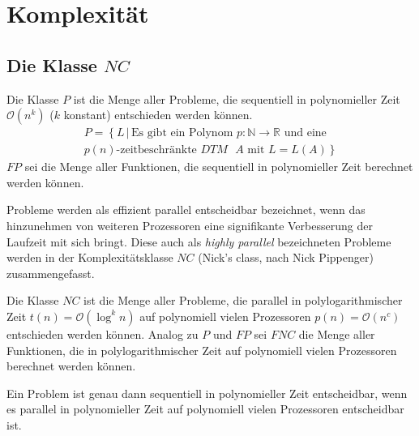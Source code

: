 \section{Komplexität}

\subsection{Die Klasse $NC$}
\begin{define}
    Die Klasse $P$ ist die Menge aller Probleme, die sequentiell in 
    polynomieller Zeit $\mathcal{O}(n^k)$ ($k$ konstant) entschieden werden können.
    \begin{equation}
        \begin{split}
            P = \left\{ L \, | \, \text{Es gibt ein Polynom } p\colon \mathbb{N} \to \mathbb{R} \right.
            \text{ und eine} \\ \left. \text{$p(n)$-zeitbeschränkte $DTM$ $A$ mit } L = L(A) \right\}
        \end{split}
    \end{equation}
    $FP$ sei die Menge aller Funktionen, die sequentiell in polynomieller Zeit
    berechnet werden können.
    \cite[S.205]{fgi1}\cite[S.44f]{greenlaw}
\end{define}
%
Probleme werden als effizient parallel entscheidbar bezeichnet, wenn das
hinzunehmen von weiteren Prozessoren eine signifikante Verbesserung der
Laufzeit mit sich bringt.
Diese auch als \emph{highly parallel} bezeichneten Probleme werden in der
Komplexitätsklasse $NC$ (Nick's class, nach Nick Pippenger) zusammengefasst.
%
\begin{define}
    Die Klasse $NC$ ist die Menge aller Probleme, die parallel in
    polylogarithmischer Zeit $t(n) = \mathcal{O}(\log^k n)$ auf polynomiell
    vielen Prozessoren $p(n) = \mathcal{O}(n^c)$ entschieden werden können.
    Analog zu $P$ und $FP$ sei $FNC$ die Menge aller Funktionen, die in
    polylogarithmischer Zeit auf polynomiell vielen Prozessoren berechnet
    werden können.
    \cite[S.44f]{greenlaw}
\end{define}
%
\begin{lemma}
    Ein Problem ist genau dann sequentiell in polynomieller Zeit entscheidbar,
    wenn es parallel in polynomieller Zeit auf polynomiell vielen Prozessoren
    entscheidbar ist.\cite[S.44]{greenlaw}
    \label{seqiffpar}
\end{lemma}
